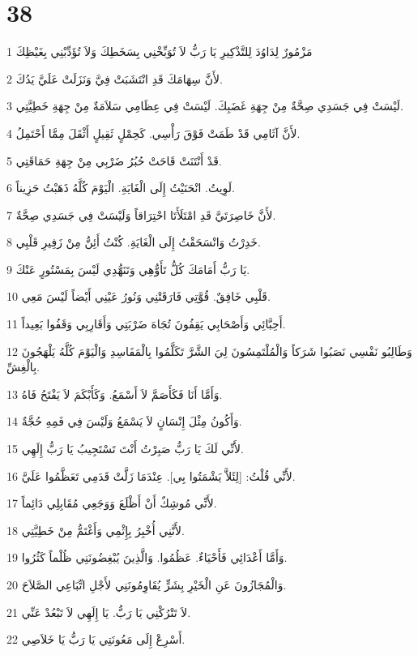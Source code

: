 \chapter{38}

\par 1 مَزْمُورٌ لِدَاوُدَ لِلتَّذْكِيرِ يَا رَبُّ لاَ تُوَبِّخْنِي بِسَخَطِكَ وَلاَ تُؤَدِّبْنِي بِغَيْظِكَ
\par 2 لأَنَّ سِهَامَكَ قَدِ انْتَشَبَتْ فِيَّ وَنَزَلَتْ عَلَيَّ يَدُكَ.
\par 3 لَيْسَتْ فِي جَسَدِي صِحَّةٌ مِنْ جِهَةِ غَضَبِكَ. لَيْسَتْ فِي عِظَامِي سَلاَمَةٌ مِنْ جِهَةِ خَطِيَّتِي.
\par 4 لأَنَّ آثَامِي قَدْ طَمَتْ فَوْقَ رَأْسِي. كَحِمْلٍ ثَقِيلٍ أَثْقَلَ مِمَّا أَحْتَمِلُ.
\par 5 قَدْ أَنْتَنَتْ قَاحَتْ حُبُرُ ضَرْبِي مِنْ جِهَةِ حَمَاقَتِي.
\par 6 لَوِيتُ. انْحَنَيْتُ إِلَى الْغَايَةِ. الْيَوْمَ كُلَّهُ ذَهَبْتُ حَزِيناً.
\par 7 لأَنَّ خَاصِرَتَيَّ قَدِ امْتَلَأَتَا احْتِرَاقاً وَلَيْسَتْ فِي جَسَدِي صِحَّةٌ.
\par 8 خَدِرْتُ وَانْسَحَقْتُ إِلَى الْغَايَةِ. كُنْتُ أَئِنُّ مِنْ زَفِيرِ قَلْبِي.
\par 9 يَا رَبُّ أَمَامَكَ كُلُّ تَأَوُّهِي وَتَنَهُّدِي لَيْسَ بِمَسْتُورٍ عَنْكَ.
\par 10 قَلْبِي خَافِقٌ. قُوَّتِي فَارَقَتْنِي وَنُورُ عَيْنِي أَيْضاً لَيْسَ مَعِي.
\par 11 أَحِبَّائِي وَأَصْحَابِي يَقِفُونَ تُجَاهَ ضَرْبَتِي وَأَقَارِبِي وَقَفُوا بَعِيداً.
\par 12 وَطَالِبُو نَفْسِي نَصَبُوا شَرَكاً وَالْمُلْتَمِسُونَ لِيَ الشَّرَّ تَكَلَّمُوا بِالْمَفَاسِدِ وَالْيَوْمَ كُلَّهُ يَلْهَجُونَ بِالْغِشِّ.
\par 13 وَأَمَّا أَنَا فَكَأَصَمَّ لاَ أَسْمَعُ. وَكَأَبْكَمَ لاَ يَفْتَحُ فَاهُ.
\par 14 وَأَكُونُ مِثْلَ إِنْسَانٍ لاَ يَسْمَعُ وَلَيْسَ فِي فَمِهِ حُجَّةٌ.
\par 15 لأَنِّي لَكَ يَا رَبُّ صَبِرْتُ أَنْتَ تَسْتَجِيبُ يَا رَبُّ إِلَهِي.
\par 16 لأَنِّي قُلْتُ: [لِئَلاَّ يَشْمَتُوا بِي]. عِنْدَمَا زَلَّتْ قَدَمِي تَعَظَّمُوا عَلَيَّ.
\par 17 لأَنِّي مُوشِكٌ أَنْ أَظْلَعَ وَوَجَعِي مُقَابِلِي دَائِماً.
\par 18 لأَنَّنِي أُخْبِرُ بِإِثْمِي وَأَغْتَمُّ مِنْ خَطِيَّتِي.
\par 19 وَأَمَّا أَعْدَائِي فَأَحْيَاءٌ. عَظُمُوا. وَالَّذِينَ يُبْغِضُونَنِي ظُلْماً كَثُرُوا.
\par 20 وَالْمُجَازُونَ عَنِ الْخَيْرِ بِشَرٍّ يُقَاوِمُونَنِي لأَجْلِ اتِّبَاعِي الصَّلاَحَ.
\par 21 لاَ تَتْرُكْنِي يَا رَبُّ. يَا إِلَهِي لاَ تَبْعُدْ عَنِّي.
\par 22 أَسْرِعْ إِلَى مَعُونَتِي يَا رَبُّ يَا خَلاَصِي.

